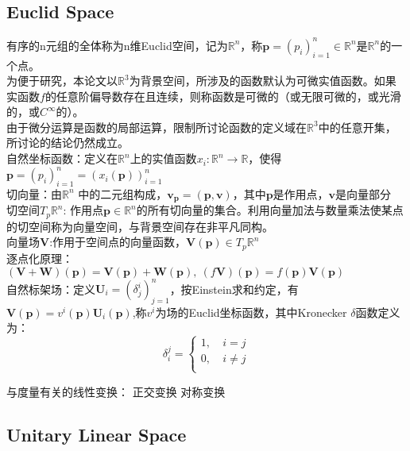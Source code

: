\documentclass[UTF8]{../../09-Mathematics}
\begin{document}
\subsection{Euclid Space}
有序的n元组的全体称为n维Euclid空间，记为$\mathbb R^n$，称$\boldsymbol p=(p_i)_{i=1}^n \in \mathbb R^n$是$\mathbb R^n$的一个点。\\
为便于研究，本论文以$ \mathbb R^3$为背景空间，所涉及的函数默认为可微实值函数。如果实函数$f$的任意阶偏导数存在且连续，则称函数是可微的（或无限可微的，或光滑的，或$C^\infty$的）。\\
由于微分运算是函数的局部运算，限制所讨论函数的定义域在$ \mathbb R^3$中的任意开集，所讨论的结论仍然成立。\\
自然坐标函数：定义在$\mathbb R^n$上的实值函数$x_i: \mathbb R^n \to  \mathbb R$，使得$\boldsymbol p=(p_i)_{i=1}^n = \left( x_i(\boldsymbol p) \right)_{i=1}^n   $\\
切向量：由$\mathbb R^n$ 中的二元组构成，$\boldsymbol v_{\boldsymbol p}=(\boldsymbol p,\boldsymbol v)$，其中$\boldsymbol p$是作用点，$\boldsymbol v$是向量部分\\
切空间$T_p  \mathbb R^n$: 作用点$\boldsymbol p \in \mathbb R^n$的所有切向量的集合。利用向量加法与数量乘法使某点的切空间称为向量空间，与背景空间存在非平凡同构。\\
向量场$\boldsymbol V$:作用于空间点的向量函数，$\boldsymbol V(\boldsymbol p)\in T_p  \mathbb R^n $\\
逐点化原理：$(\boldsymbol V+\boldsymbol W)(\boldsymbol p)=\boldsymbol V(\boldsymbol p)+\boldsymbol W(\boldsymbol p),\ (f \boldsymbol V)(\boldsymbol p)= f(\boldsymbol p)\boldsymbol V (\boldsymbol p)$\\
自然标架场：定义$\boldsymbol U_i=(\delta _j^i)_{j=1}^n$，按Einstein求和约定，有$\boldsymbol V(\boldsymbol p)=v^i(\boldsymbol p)\boldsymbol U_i(\boldsymbol p)$,称$v^i$为场的Euclid坐标函数，其中Kronecker $\delta$函数定义为：
\begin{equation}
\label{Kronecker_delta}
\delta _i^j=\left\{ 
    \begin{aligned}
    1,\  & i =j\\
    0,\  & i \neq j\\
    \end{aligned}
     \right.
\end{equation}


与度量有关的线性变换：
正交变换
对称变换



\subsection{Unitary Linear Space}
\end{document}
